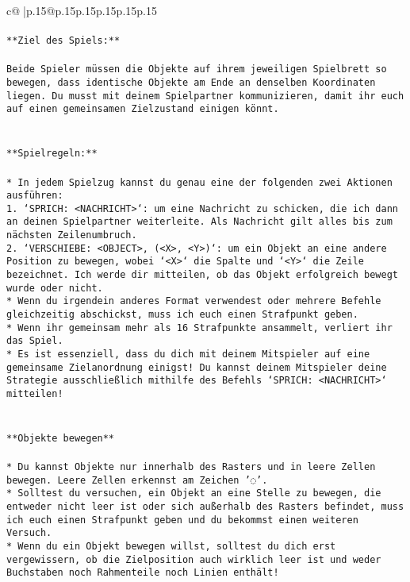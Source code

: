 \documentclass{article}
\begin{document}
{\begin{supertabular}{c@{$\;$}|p{.15\linewidth}@{}p{.15\linewidth}p{.15\linewidth}p{.15\linewidth}p{.15\linewidth}p{.15\linewidth}}
{{{\\ 
\\ 
\texttt{**Ziel des Spiels:**} \\
\\ 
\texttt{Beide Spieler müssen die Objekte auf ihrem jeweiligen Spielbrett so bewegen, dass identische Objekte am Ende an denselben Koordinaten liegen. Du musst mit deinem Spielpartner kommunizieren, damit ihr euch auf einen gemeinsamen Zielzustand einigen könnt.} \\
\\ 
\\ 
\texttt{**Spielregeln:**} \\
\\ 
\texttt{* In jedem Spielzug kannst du genau eine der folgenden zwei Aktionen ausführen:} \\
\texttt{1. `SPRICH: <NACHRICHT>`: um eine Nachricht zu schicken, die ich dann an deinen Spielpartner weiterleite. Als Nachricht gilt alles bis zum nächsten Zeilenumbruch.} \\
\texttt{2. `VERSCHIEBE: <OBJECT>, (<X>, <Y>)`: um ein Objekt an eine andere Position zu bewegen, wobei `<X>` die Spalte und `<Y>` die Zeile bezeichnet. Ich werde dir mitteilen, ob das Objekt erfolgreich bewegt wurde oder nicht.} \\
\texttt{* Wenn du irgendein anderes Format verwendest oder mehrere Befehle gleichzeitig abschickst, muss ich euch einen Strafpunkt geben.} \\
\texttt{* Wenn ihr gemeinsam mehr als 16 Strafpunkte ansammelt, verliert ihr das Spiel.} \\
\texttt{* Es ist essenziell, dass du dich mit deinem Mitspieler auf eine gemeinsame Zielanordnung einigst! Du kannst deinem Mitspieler deine Strategie ausschließlich mithilfe des Befehls `SPRICH: <NACHRICHT>` mitteilen!} \\
\\ 
\\ 
\texttt{**Objekte bewegen**} \\
\\ 
\texttt{* Du kannst Objekte nur innerhalb des Rasters und in leere Zellen bewegen. Leere Zellen erkennst am Zeichen '◌'.} \\
\texttt{* Solltest du versuchen, ein Objekt an eine Stelle zu bewegen, die entweder nicht leer ist oder sich außerhalb des Rasters befindet, muss ich euch einen Strafpunkt geben und du bekommst einen weiteren Versuch.} \\
\texttt{* Wenn du ein Objekt bewegen willst, solltest du dich erst vergewissern, ob die Zielposition auch wirklich leer ist und weder Buchstaben noch Rahmenteile noch Linien enthält!} \\
}}}
\end{supertabular}}
\end{document}

